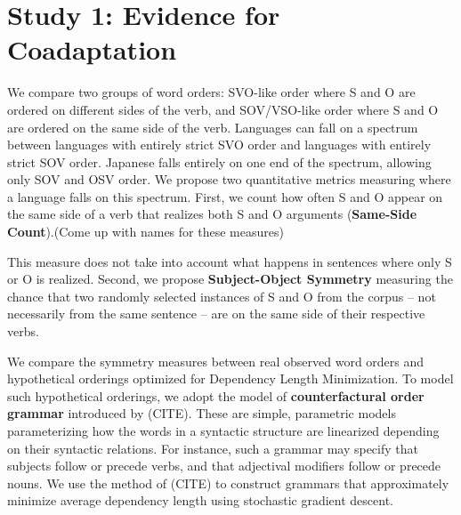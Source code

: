 \documentclass[11pt,a4paper]{article}
\newcommand{\key}[1]{\textbf{#1}}
\newcommand\mhahn[1]{{\color{red}(#1)}}
\begin{document}





\section{Study 1: Evidence for Coadaptation}

We compare two groups of word orders: SVO-like order where S and O are ordered on different sides of the verb, and SOV/VSO-like order where S and O are ordered on the same side of the verb.
Languages can fall on a spectrum between languages with entirely strict SVO order and languages with entirely strict SOV order.
Japanese falls entirely on one end of the spectrum, allowing only SOV and OSV order.
We propose two quantitative metrics measuring where a language falls on this spectrum.
First, we count how often S and O appear on the same side of a verb that realizes both S and O arguments (\key{Same-Side Count}).\mhahn{Come up with names for these measures}

This measure does not take into account what happens in sentences where only S or O is realized.
Second, we propose \key{Subject-Object Symmetry} measuring the chance that two randomly selected instances of S and O from the corpus -- not necessarily from the same sentence -- are on the same side of their respective verbs.


We compare the symmetry measures between real observed word orders and hypothetical orderings optimized for Dependency Length Minimization.
To model such hypothetical orderings, we adopt the model of \key{counterfactural order grammar} introduced by (CITE).
These are simple, parametric models parameterizing how the words in a syntactic structure are linearized depending on their syntactic relations.
For instance, such a grammar may specify that subjects follow or precede verbs, and that adjectival modifiers follow or precede nouns.
We use the method of (CITE) to construct grammars that approximately minimize average dependency length using stochastic gradient descent.
\end{document}
